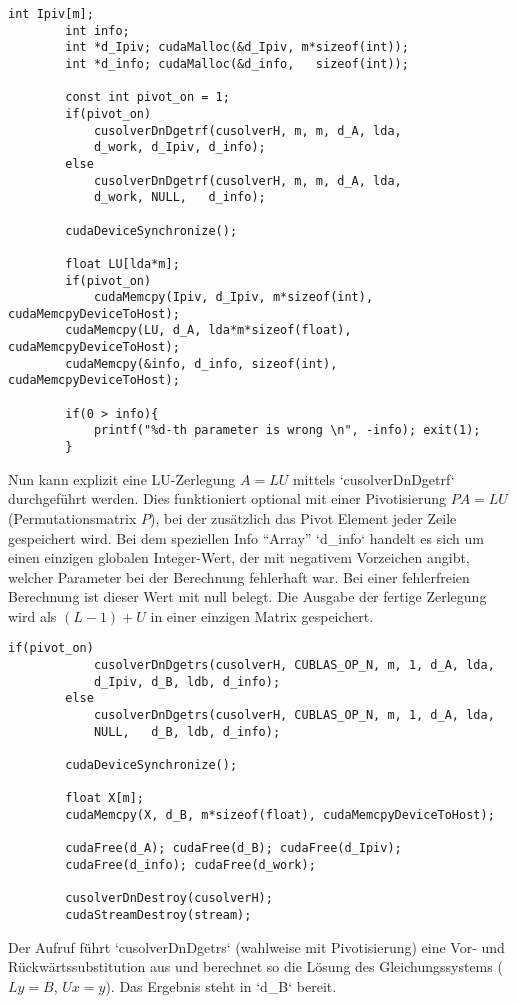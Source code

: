 		\begin{lstlisting}[caption=cuSOLVER: LU-Zerlegung]
		int Ipiv[m];      
		int info; 
		int *d_Ipiv; cudaMalloc(&d_Ipiv, m*sizeof(int));
		int *d_info; cudaMalloc(&d_info,   sizeof(int));
		
		const int pivot_on = 1;
		if(pivot_on) 
			cusolverDnDgetrf(cusolverH, m, m, d_A, lda, 
			d_work, d_Ipiv, d_info);
		else          
			cusolverDnDgetrf(cusolverH, m, m, d_A, lda, 
			d_work, NULL,   d_info);
			
		cudaDeviceSynchronize();

		float LU[lda*m];
		if(pivot_on) 
			cudaMemcpy(Ipiv, d_Ipiv, m*sizeof(int), cudaMemcpyDeviceToHost);
		cudaMemcpy(LU, d_A, lda*m*sizeof(float), cudaMemcpyDeviceToHost);
		cudaMemcpy(&info, d_info, sizeof(int), cudaMemcpyDeviceToHost);

		if(0 > info){	
			printf("%d-th parameter is wrong \n", -info); exit(1);
		}
		\end{lstlisting}
		
		Nun kann explizit eine LU-Zerlegung $A = LU$ mittels \li`cusolverDnDgetrf` durchgeführt werden. Dies funktioniert optional mit einer Pivotisierung $PA = LU$ (Permutationsmatrix $P$), bei der zusätzlich das Pivot Element jeder Zeile gespeichert wird. Bei dem speziellen Info \enquote{Array} \li`d_info` handelt es sich um einen einzigen globalen Integer-Wert, der mit negativem Vorzeichen angibt, welcher Parameter bei der Berechnung fehlerhaft war. Bei einer fehlerfreien Berechnung ist dieser Wert mit null belegt. Die Ausgabe der fertige Zerlegung wird als $(L-1)+U$ in einer einzigen Matrix gespeichert.
		
		\begin{lstlisting}[caption=cuSOLVER: Gleichungssystem lösen]
		if(pivot_on) 
			cusolverDnDgetrs(cusolverH, CUBLAS_OP_N, m, 1, d_A, lda, 
			d_Ipiv, d_B, ldb, d_info);
		else         
			cusolverDnDgetrs(cusolverH, CUBLAS_OP_N, m, 1, d_A, lda, 
			NULL,   d_B, ldb, d_info);
			
		cudaDeviceSynchronize();

		float X[m];
		cudaMemcpy(X, d_B, m*sizeof(float), cudaMemcpyDeviceToHost);

		cudaFree(d_A); cudaFree(d_B); cudaFree(d_Ipiv);
		cudaFree(d_info); cudaFree(d_work);

		cusolverDnDestroy(cusolverH);
		cudaStreamDestroy(stream);
		\end{lstlisting}
		
		Der Aufruf führt \li`cusolverDnDgetrs` (wahlweise mit Pivotisierung) eine Vor- und Rückwärtssubstitution aus und berechnet so die Lösung des Gleichungssystems ($Ly = B$, $Ux = y$). Das Ergebnis steht in \li`d_B` bereit.
		
